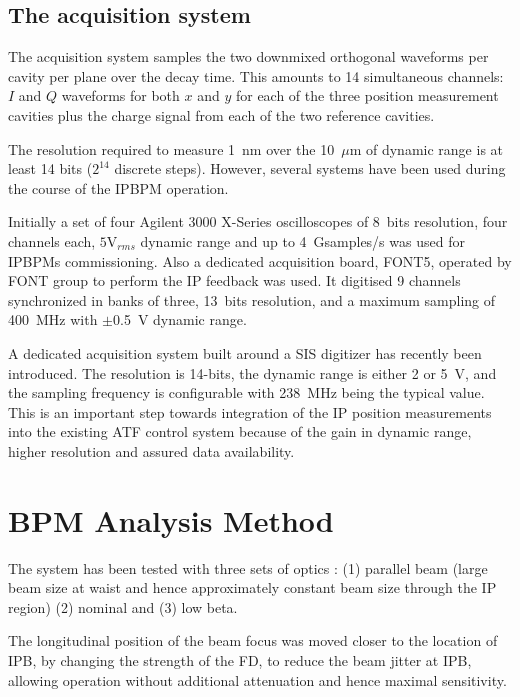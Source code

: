 \subsection{The acquisition system}\label{s:acqsys}
The acquisition system samples the two downmixed orthogonal waveforms per cavity per plane over the decay time. This amounts to 14 simultaneous channels: $I$ and $Q$ waveforms for both $x$ and $y$ for each of the three position measurement cavities plus the charge signal from each of the two reference cavities.\par
The resolution required to measure 1~nm over the 10~$\mu$m of dynamic range is at least 14 bits ($2^{14}$ discrete steps). However, several systems have been used during the course of the IPBPM operation.\par
Initially a set of four Agilent 3000 X-Series oscilloscopes of 8~bits resolution, four channels each, $5$V$_{rms}$ dynamic range and up to 4~Gsamples/s was used for IPBPMs commissioning. Also a dedicated acquisition board, FONT5, operated by FONT group to perform the IP feedback was used. It digitised 9 channels synchronized in banks of three, 13~bits resolution, and a maximum sampling of 400~MHz with $\pm$0.5~V dynamic range.\par
A dedicated acquisition system built around a SIS digitizer has recently been introduced. The resolution is 14-bits, the dynamic range is either 2 or 5~V, and the sampling frequency is configurable with 238~MHz being the typical value. This is an important step towards integration of the IP position measurements into the existing ATF control system because of the gain in dynamic range, higher resolution and assured data availability.\par
\section{BPM Analysis Method}
The system has been tested with three sets of optics : (1) parallel beam (large beam size at waist and hence approximately constant beam size through the IP region) (2) nominal and (3) low beta.\par
The longitudinal position of the beam focus was moved closer to the location of IPB, by changing the strength of the FD, to reduce the beam jitter at IPB, allowing operation without additional attenuation and hence maximal sensitivity.\par
